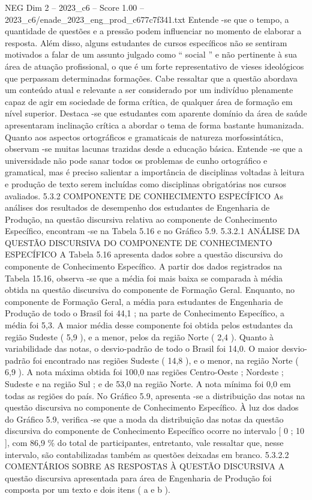 \begin{textsample}{NEG Dim 2 – 2023\_c6 – Score 1.00 – 2023\_c6/enade\_2023\_eng\_prod\_c677c7f341.txt}
Entende -se que o tempo, a quantidade de questões e a pressão podem influenciar no momento de elaborar a resposta.
Além disso, alguns estudantes de cursos específicos não se sentiram motivados a falar de um assunto julgado como “ social ” e não pertinente à sua área de atuação profissional, o que é um forte representativo de vieses ideológicos que perpassam determinadas formações.
Cabe ressaltar que a questão abordava um conteúdo atual e relevante a ser considerado por um indivíduo plenamente capaz de agir em sociedade de forma crítica, de qualquer área de formação em nível superior.
Destaca -se que estudantes com aparente domínio da área de saúde apresentaram inclinação crítica a abordar o tema de forma bastante humanizada.
Quanto aos aspectos ortográficos e gramaticais de natureza morfossintática, observam -se muitas lacunas trazidas desde a educação básica.
Entende -se que a universidade não pode sanar todos os problemas de cunho ortográfico e gramatical, mas é preciso salientar a importância de disciplinas voltadas à leitura e produção de texto serem incluídas como disciplinas obrigatórias nos cursos avaliados. 5.3.2 COMPONENTE DE CONHECIMENTO ESPECÍFICO As análises dos resultados de desempenho dos estudantes de Engenharia de Produção, na questão discursiva relativa ao componente de Conhecimento Específico, encontram -se na Tabela 5.16 e no Gráfico 5.9. 5.3.2.1 ANÁLISE DA QUESTÃO DISCURSIVA DO COMPONENTE DE CONHECIMENTO ESPECÍFICO A Tabela 5.16 apresenta dados sobre a questão discursiva do componente de Conhecimento Específico.
A partir dos dados registrados na Tabela 15.16, observa -se que a média foi mais baixa se comparada à média obtida na questão discursiva do componente de Formação Geral.
Enquanto, no componente de Formação Geral, a média para estudantes de Engenharia de Produção de todo o Brasil foi 44,1 ; na parte de Conhecimento Específico, a média foi 5,3.
A maior média desse componente foi obtida pelos estudantes da região Sudeste ( 5,9 ), e a menor, pelos da região Norte ( 2,4 ).
Quanto à variabilidade das notas, o desvio-padrão de todo o Brasil foi 14,0.
O maior desvio-padrão foi encontrado nas regiões Sudeste ( 14,8 ), e o menor, na região Norte ( 6,9 ).
A nota máxima obtida foi 100,0 nas regiões Centro-Oeste ; Nordeste ; Sudeste e na região Sul ; e de 53,0 na região Norte.
A nota mínima foi 0,0 em todas as regiões do país.
No Gráfico 5.9, apresenta -se a distribuição das notas na questão discursiva no componente de Conhecimento Específico.
À luz dos dados do Gráfico 5.9, verifica -se que a moda da distribuição das notas da questão discursiva do componente de Conhecimento Específico ocorre no intervalo [ 0 ; 10 ], com 86,9 \% do total de participantes, entretanto, vale ressaltar que, nesse intervalo, são contabilizadas também as questões deixadas em branco. 5.3.2.2 COMENTÁRIOS SOBRE AS RESPOSTAS À QUESTÃO DISCURSIVA A questão discursiva apresentada para área de Engenharia de Produção foi composta por um texto e dois itens ( a e b ).

\end{textsample}
